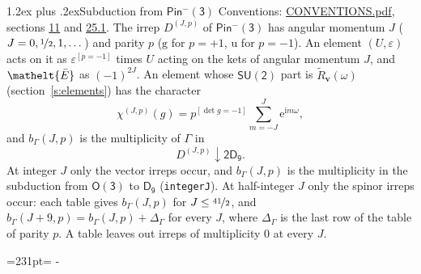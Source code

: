\documentclass[10pt,a4paper]{article}
\makeatletter
\renewcommand\section{\@startsection{section}{1}{\z@}{-3ex plus -1ex minus -.2ex}%
  {1.2ex plus .2ex}{\normalfont\large\sffamily\bfseries\color{parttitle}}}
\newcommand{\needspace}[1]{\par\penalty-100\begingroup\dimen0=#1\relax\dimen2=\pagegoal
  \advance\dimen2-\pagetotal\ifdim\dimen0>\dimen2\relax\ifdim\dimen2>0pt\vfil\break\fi\fi
  \endgroup}
\numberwithin{equation}{section}
\newcommand{\eltfont}[1]{{\let\sigma\eltsigma\mathelt{#1}}}
\newcommand{\grp}[1]{\mathsf{#1}}
\newcommand{\elt}[1]{\eltfont{#1}}
\newcommand{\ptag}[1]{\mathrm{#1}}
\newcommand{\iverson}[1]{[#1]}
\newcommand{\restr}[2]{#1\!\downarrow#2}
\newcommand{\vv}{\mathbf{v}}
\newcommand{\iunit}{\mathrm{i}}
\newcommand{\expe}{\mathrm{e}}
\newcommand{\irrJp}[2]{D^{(#1,#2)}}
\newcommand{\barred}[1]{\bar{#1}}
\newcommand{\lift}[1]{\tilde{#1}}
\makeatother
\begin{document}
\section{Subduction from \texorpdfstring{$\grp{Pin^{-}(3)}$}{Pin(3)}}\label{s:subduction_parent}
Conventions: \href{../../CONVENTIONS.pdf}{CONVENTIONS.pdf}, sections \href{../../../rotation/CONVENTIONS.pdf\#conv.11}{11} and \href{../../CONVENTIONS.pdf\#conv.25.1}{25.1}.
\leavevmode\label{n:index.J}\label{n:index.parity}\label{n:irrep.o3}The irrep $\irrJp{J}{p}$ of \href{Pinminus3.pdf}{$\grp{Pin^{-}(3)}$} has angular momentum $J$ ($J = 0, \nicefrac{1}{2}, 1, \dots$) and parity $p$ ($\ptag{g}$ for $p = +1$, $\ptag{u}$ for $p = -1$). An element $(U, \varepsilon)$ acts on it as $\varepsilon^{[p = -1]}$ times $U$ acting on the kets of angular momentum $J$, and $\elt{\barred{E}}$ as $(-1)^{2J}$. \label{n:function.character.parent}\label{n:function.multiplicity}An element whose $\grp{SU(2)}$ part is $\lift{R}_{\vv}(\omega)$ (section~\ref{s:elements}) has the character
\begin{equation}\label{e:chi}\chi^{(J,p)}(g) = p^{\iverson{\det g = -1}}\sum_{m=-J}^{J} \expe^{\iunit m\omega},\end{equation}
and $b_\Gamma(J, p)$ is the multiplicity of $\Gamma$ in
\begin{equation}\label{e:parent}\restr{\irrJp{J}{p}}{\grp{2D_{9}}}.\end{equation}
At integer $J$ only the vector irreps occur, and $b_\Gamma(J, p)$ is the multiplicity in the subduction from $\grp{O(3)}$ to \href{../../../rotation/data/pdf/D9.pdf}{$\grp{D_{9}}$} (\texttt{integerJ}). \label{n:index.increment}At half-integer $J$ only the spinor irreps occur: each table gives $b_\Gamma(J, p)$ for $J \le \nicefrac{41}{2}$, and $b_\Gamma(J + 9, p) = b_\Gamma(J, p) + \Delta_\Gamma$ for every $J$, where $\Delta_\Gamma$ is the last row of the table of parity $p$. A table leaves out irreps of multiplicity 0 at every $J$.
\needspace{231pt}
\end{document}
